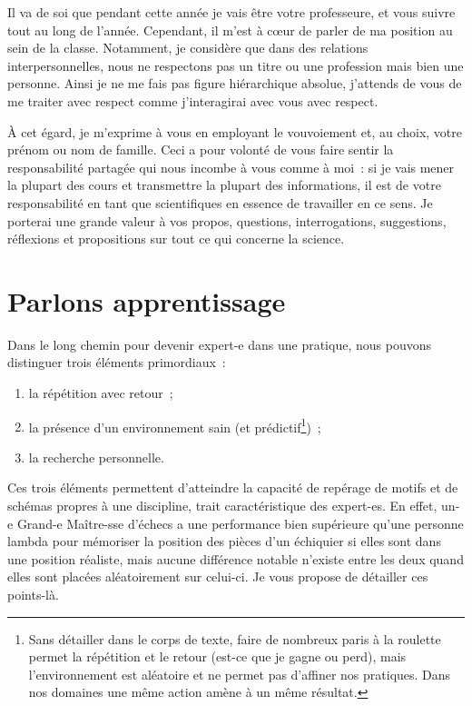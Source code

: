 \documentclass[a4paper, 10pt, final, garamond]{book}
\begin{document}
Il va de soi que pendant cette année je vais être votre professeure, et vous
suivre tout au long de l'année. Cependant, il m'est à cœur de parler de ma
position au sein de la classe. Notamment, je considère que dans des relations
interpersonnelles, nous ne respectons pas un titre ou une profession mais bien
une personne. Ainsi je ne me fais pas figure hiérarchique absolue, j'attends de
vous de me traiter avec respect comme j'interagirai avec vous avec respect.

À cet égard, je m'exprime à vous en employant le vouvoiement et, au choix, votre
prénom ou nom de famille. Ceci a pour volonté de vous faire sentir la
responsabilité partagée qui nous incombe à vous comme à moi~: si je vais mener
la plupart des cours et transmettre la plupart des informations, il est de votre
responsabilité en tant que scientifiques en essence de travailler en ce sens. Je
porterai une grande valeur à vos propos, questions, interrogations, suggestions,
réflexions et propositions sur tout ce qui concerne la science.

\section{Parlons apprentissage}

Dans le long chemin pour devenir expert-e dans une pratique, nous pouvons
distinguer trois éléments primordiaux~:
\begin{enumerate}
	\item la répétition avec retour~;
	\item la présence d'un environnement sain (et prédictif\footnote{Sans
		      détailler dans le corps de texte, faire de nombreux paris à la
		      roulette permet la répétition et le retour (est-ce que je gagne ou
		      perd), mais l'environnement est aléatoire et ne permet pas d'affiner
		      nos pratiques. Dans nos domaines une même action amène à un même
		      résultat.})~;
	\item la recherche personnelle.
\end{enumerate}

Ces trois éléments permettent d'atteindre la capacité de repérage de motifs et
de schémas propres à une discipline, trait caractéristique des expert-es. En
effet, un-e Grand-e Maître-sse d'échecs a une performance bien supérieure qu'une
personne lambda pour mémoriser la position des pièces d'un échiquier si elles
sont dans une position réaliste, mais aucune différence notable n'existe entre
les deux quand elles sont placées aléatoirement sur celui-ci. Je vous propose de
détailler ces points-là.
\end{document}
